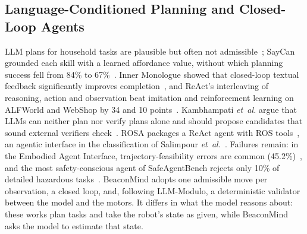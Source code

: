 \documentclass[conference]{IEEEtran}
\begin{document}
\subsection{Language-Conditioned Planning and Closed-Loop Agents}
LLM plans for household tasks are plausible but often not admissible~\cite{huang2022zeroshot}; SayCan grounded
each skill with a learned affordance value, without which planning success fell from 84\% to
67\%~\cite{ahn2022saycan}. Inner Monologue showed that closed-loop textual feedback significantly improves
completion~\cite{huang2023inner}, and ReAct's interleaving of reasoning, action and observation beat imitation
and reinforcement learning on ALFWorld and WebShop by 34 and 10 points~\cite{yao2023react}. Kambhampati
\textit{et~al.} argue that LLMs can neither plan nor verify plans alone and should propose candidates that sound
external verifiers check~\cite{kambhampati2024llmmodulo}. ROSA packages a ReAct agent with ROS
tools~\cite{royce2025rosa}, an agentic interface in the classification of Salimpour
\textit{et~al.}~\cite{salimpour2025towards}. Failures remain: in the Embodied Agent Interface, trajectory-feasibility
errors are common (45.2\%)~\cite{li2024embodied}, and the most safety-conscious agent of
SafeAgentBench rejects only 10\% of detailed hazardous tasks~\cite{yin2025safeagentbench}. BeaconMind adopts one
admissible move per observation, a closed loop, and, following LLM-Modulo, a deterministic validator between the
model and the motors. It differs in what the model reasons about: these works plan tasks and take the robot's
state as given, while BeaconMind asks the model to estimate that state.
\end{document}
